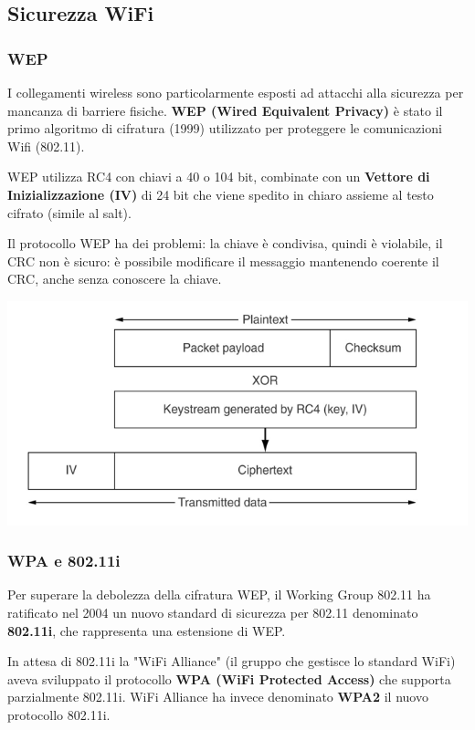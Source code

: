     \subsection{Sicurezza WiFi}
        \subsubsection{WEP}
            I collegamenti wireless sono particolarmente esposti ad attacchi alla sicurezza per mancanza di barriere fisiche. \textbf{WEP (Wired Equivalent Privacy)} è stato il primo algoritmo di cifratura (1999) utilizzato per proteggere le comunicazioni Wifi (802.11).

            WEP utilizza RC4 con chiavi a 40 o 104 bit, combinate con un \textbf{Vettore di Inizializzazione (IV)} di 24 bit che viene spedito in chiaro assieme al testo cifrato (simile al salt).

            Il protocollo WEP ha dei problemi: la chiave è condivisa, quindi è violabile, il CRC non è sicuro: è possibile modificare il messaggio mantenendo coerente il CRC, anche senza conoscere la chiave.

            \begin{center}
                \includegraphics[scale=0.4]{chapters/7/assets/schema_zzb.png}
            \end{center}

        \subsubsection{WPA e 802.11i}
            Per superare la debolezza della cifratura WEP, il Working Group 802.11 ha ratificato nel 2004 un nuovo standard di sicurezza per 802.11 denominato \textbf{802.11i}, che rappresenta una estensione di WEP.
        
            In attesa di 802.11i la "WiFi Alliance" (il gruppo che gestisce lo standard WiFi) aveva sviluppato il protocollo \textbf{WPA (WiFi Protected Access)} che supporta parzialmente 802.11i. WiFi Alliance ha invece denominato \textbf{WPA2} il nuovo protocollo 802.11i.
        
